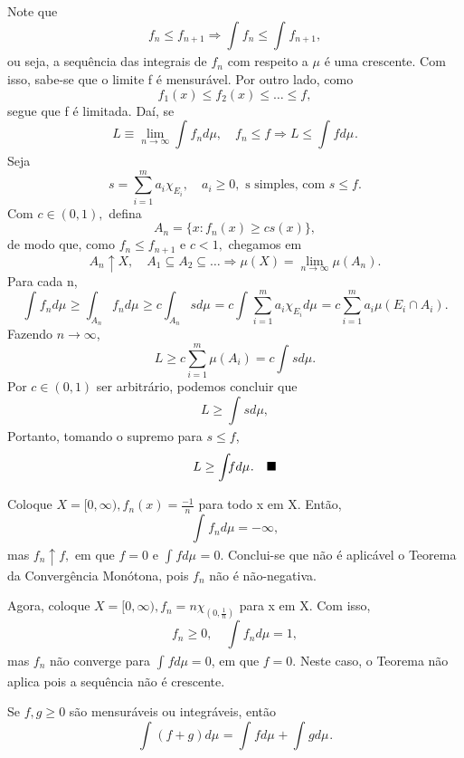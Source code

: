 \documentclass[measure_theory.tex]{subfiles}
\begin{document}
\begin{proof*}
	Note que
	\[
		f_{n}\leq f_{n+1} \Rightarrow \int_{}^{}f_{n}\leq \int_{}^{}f_{n+1},
	\]
	ou seja, a sequência das integrais de \(f_{n}\) com respeito a \(\mu \) é uma crescente. Com isso, sabe-se que o limite f é mensurável. Por outro lado, como
	\[
		f_1(x)\leq f_2(x)\leq \dotsc \leq f,
	\]
	segue que f é limitada. Daí, se
	\[
		L\equiv \lim_{n\to \infty}\int_{}^{}f_{n}d\mu ,\quad f_{n}\leq f \Rightarrow L \leq \int_{}f d\mu_{}.
	\]
	Seja
	\[
		s = \sum\limits_{i=1}^{m}a_{i}\chi_{E_{i}},\quad a_{i}\geq 0, \text{ s simples, com } s\leq f.
	\]
	Com \(c\in (0, 1),\) defina
	\[
		A_{n} = \{x: f_{n}(x) \geq cs(x)\},
	\]
	de modo que, como \(f_{n}\leq f_{n+1}\) e \(c < 1,\) chegamos em
	\[
		A_{n}\uparrow X,\quad A_1\subseteq A_2\subseteq \dotsc \Rightarrow \mu (X) = \lim_{n\to \infty}\mu (A_{n}).
	\]
	Para cada n,
	\[
		\int_{}f_{n} d\mu_{} \geq \int_{A_{n}}f_{n} d\mu_{} \geq c \int_{A_{n}}s d\mu_{} = c \int_{}\sum\limits_{i=1}^{m}a_{i}\chi_{E_{i}} d\mu_{} = c \sum\limits_{i=1}^{m}a_{i}\mu (E_{i}\cap A_{i}).
	\]
	Fazendo \(n\to \infty\),
	\[
		L \geq c \sum\limits_{i=1}^{m}\mu (A_{i}) = c \int_{}^{}s d\mu .
	\]
	Por \(c\in (0, 1)\) ser arbitrário, podemos concluir que
	\[
		L \geq \int_{}^{}s d\mu,
	\]
	Portanto, tomando o supremo para \(s \leq f\),
	\[
		L \geq \int_{}f d\mu_{}.\quad \text{$\blacksquare$}
	\]
\end{proof*}
\begin{example}
	Coloque \(X = [0, \infty), f_{n}(x) = \frac{-1}{n}\) para todo x em X. Então,
	\[
		\int_{}^{}f_{n}d\mu = -\infty,
	\]
	mas \(f_{n}\uparrow f,\) em que \(f=0\) e \(\int_{}f d\mu_{} = 0.\) Conclui-se que não é aplicável o Teorema da Convergência Monótona, pois \(f_{n}\) não é não-negativa.
\end{example}
\begin{example}
	Agora, coloque \(X = [0, \infty), f_{n} = n \chi_{(0, \frac{1}{n})}\) para x em X. Com isso,
	\[
		f_{n}\geq 0,\quad \int_{}^{}f_{n}d\mu = 1,
	\]
	mas \(f_{n}\) não converge para \(\int_{}^{}f d\mu = 0\), em que \(f=0\). Neste caso, o Teorema não aplica pois a sequência não é crescente.
\end{example}
\begin{theorem*}
	Se \(f, g \geq 0\) são mensuráveis ou integráveis, então
	\[
		\int_{}(f+g) d\mu_{} = \int_{}f d\mu_{} + \int_{}g d\mu_{}.
	\]
\end{theorem*}
\end{document}
